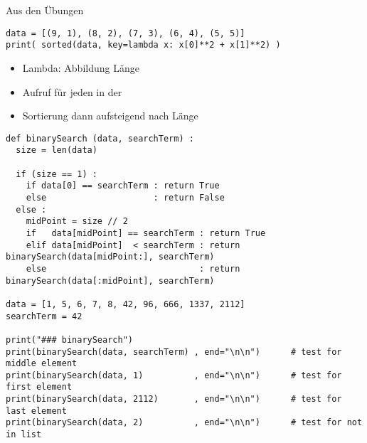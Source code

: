 \begin{frame}[fragile]{Aus den Übungen}
%
\begin{codebox}
\begin{verbatim}
data = [(9, 1), (8, 2), (7, 3), (6, 4), (5, 5)]
print( sorted(data, key=lambda x: x[0]**2 + x[1]**2) )
\end{verbatim}
\end{codebox}
%
\begin{itemize}
\item Lambda: Abbildung  \thus Länge
\item Aufruf für jeden  in der 
\item Sortierung dann aufsteigend nach Länge
\end{itemize}
%
\end{frame}


\begin{frame}[fragile]
%
\begin{codebox}
\begin{verbatim}
def binarySearch (data, searchTerm) :
  size = len(data)
  
  if (size == 1) :
    if data[0] == searchTerm : return True
    else                     : return False
  else :
    midPoint = size // 2
    if   data[midPoint] == searchTerm : return True
    elif data[midPoint]  < searchTerm : return binarySearch(data[midPoint:], searchTerm)
    else                              : return binarySearch(data[:midPoint], searchTerm)

data = [1, 5, 6, 7, 8, 42, 96, 666, 1337, 2112]
searchTerm = 42

print("### binarySearch")
print(binarySearch(data, searchTerm) , end="\n\n")      # test for middle element
print(binarySearch(data, 1)          , end="\n\n")      # test for first element
print(binarySearch(data, 2112)       , end="\n\n")      # test for last element
print(binarySearch(data, 2)          , end="\n\n")      # test for not in list
\end{verbatim}
\end{codebox}
%
\end{frame}


